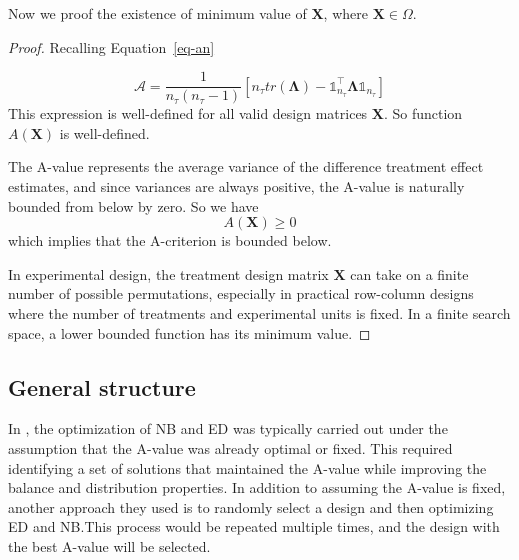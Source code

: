 \documentclass[
  a4paper,
  oneside,
  openany,
  12pt,
  onecolumn]{book}
\theoremstyle{plain}
\theoremstyle{definition}
\theoremstyle{remark}
\begin{document}
Now we proof the existence of minimum value of \(\boldsymbol{X}\), where
\(\boldsymbol{X}\in\Omega\).

\begin{proof}
Recalling Equation~\ref{eq-an}

\[
\mathscr{A}=\frac{1}{n_{\tau}(n_{\tau}-1)}[n_{\tau}tr(\boldsymbol{\Lambda})-\mathbb{1}_{n_{\tau}}^\top\boldsymbol{\Lambda}\mathbb{1}_{n_{\tau}}]
\] This expression is well-defined for all valid design matrices
\(\boldsymbol{X}\). So function \(A(\boldsymbol{X})\) is well-defined.

The A-value represents the average variance of the difference treatment
effect estimates, and since variances are always positive, the A-value
is naturally bounded from below by zero. So we have \[
A(\boldsymbol{X})\geq0
\] which implies that the A-criterion is bounded below.

In experimental design, the treatment design matrix \(\boldsymbol{X}\)
can take on a finite number of possible permutations, especially in
practical row-column designs where the number of treatments and
experimental units is fixed. In a finite search space, a lower bounded
function has its minimum value.
\end{proof}

\subsection{General structure}\label{general-structure}

In \citet{piepho2018neighbor}, the optimization of NB and ED was
typically carried out under the assumption that the A-value was already
optimal or fixed. This required identifying a set of solutions that
maintained the A-value while improving the balance and distribution
properties. In addition to assuming the A-value is fixed, another
approach they used is to randomly select a design and then optimizing ED
and NB.This process would be repeated multiple times, and the design
with the best A-value will be selected.

\begin{figure}


\caption{\label{fig-align}}

\end{figure}%
\end{document}
